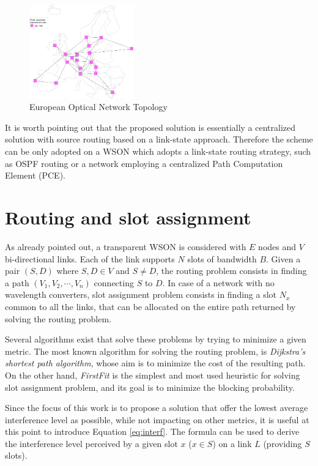 \documentclass[9pt,twocolumn]{article}
\begin{document}
\begin{figure}[!htb]
	\centering
	\includegraphics[width=0.4\textwidth]{topology.pdf}
	\caption{European Optical Network Topology}
	\label{fig:topology}
\end{figure}

It is worth pointing out that the proposed solution is essentially a centralized solution with source routing based on a link-state approach. Therefore the scheme can be only adopted on a WSON which adopts a link-state routing strategy, such as OSPF routing or a network employing a centralized Path Computation Element (PCE).

\section{Routing and slot assignment}

As already pointed out, a transparent WSON is considered with $E$ nodes and $V$ bi-directional links. Each of the link supports $N$ slots of bandwidth $B$. Given a pair $(S, D)$ where $S,D \in V$ and $S \ne D$, the routing problem consists in finding a path $(V_1, V_2, \cdots, V_n)$ connecting $S$ to $D$. In case of a network with no wavelength converters, slot assignment problem consists in finding a slot $N_x$ common to all the links, that can be allocated on the entire path returned by solving the routing problem. 

Several algorithms exist that solve these problems by trying to minimize a given metric. The most known algorithm for solving the routing problem, is \emph{Dijkstra's shortest path algorithm}, whose aim is to minimize the cost of the resulting path. On the other hand, \emph{FirstFit} is the simplest and most used heuristic for solving slot assignment problem, and its goal is to minimize the blocking probability.

Since the focus of this work is to propose a solution that offer the lowest average interference level as possible, while not impacting on other metrics, it is useful at this point to introduce Equation \ref{eq:interf}. The formula can be used to derive the interference level perceived by a given slot $x$ ($x \in S$) on a link $L$ (providing $S$ slots).
\end{document}
